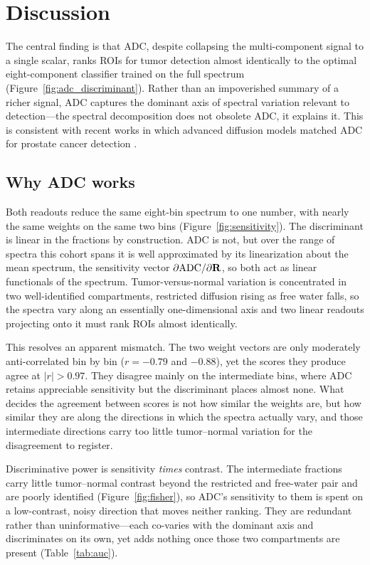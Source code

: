 \section{Discussion}
The central finding is that ADC, despite collapsing the multi-component signal to a single scalar, ranks ROIs for tumor detection almost identically to the optimal eight-component classifier trained on the full spectrum (Figure~\ref{fig:adc_discriminant}).
Rather than an impoverished summary of a richer signal, ADC captures the dominant axis of spectral variation relevant to detection---the spectral decomposition does not obsolete ADC, it explains it.
This is consistent with recent works in which advanced diffusion models matched ADC for prostate cancer detection \citep{langkilde2018evaluation, he2025improved}.

\subsection{Why ADC works}
Both readouts reduce the same eight-bin spectrum to one number, with nearly the same weights on the same two bins (Figure~\ref{fig:sensitivity}).
The discriminant is linear in the fractions by construction. ADC is not, but over the range of spectra this cohort spans it is well approximated by its linearization about the mean spectrum, the sensitivity vector $\partial\text{ADC}/\partial\mathbf{R}$, so both act as linear functionals of the spectrum.
Tumor-versus-normal variation is concentrated in two well-identified compartments, restricted diffusion rising as free water falls, so the spectra vary along an essentially one-dimensional axis and two linear readouts projecting onto it must rank ROIs almost identically.

This resolves an apparent mismatch. The two weight vectors are only moderately anti-correlated bin by bin ($r = -0.79$ and $-0.88$), yet the scores they produce agree at $|r| > 0.97$. They disagree mainly on the intermediate bins, where ADC retains appreciable sensitivity but the discriminant places almost none. What decides the agreement between scores is not how similar the weights are, but how similar they are along the directions in which the spectra actually vary, and those intermediate directions carry too little tumor--normal variation for the disagreement to register.

Discriminative power is sensitivity \emph{times} contrast. The intermediate fractions carry little tumor--normal contrast beyond the restricted and free-water pair and are poorly identified (Figure~\ref{fig:fisher}), so ADC's sensitivity to them is spent on a low-contrast, noisy direction that moves neither ranking. They are redundant rather than uninformative---each co-varies with the dominant axis and discriminates on its own, yet adds nothing once those two compartments are present (Table~\ref{tab:auc}).

